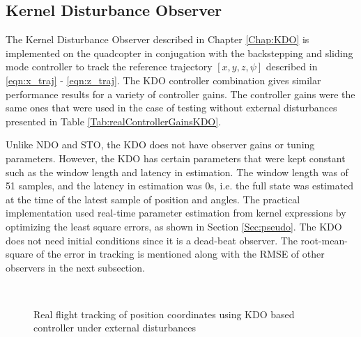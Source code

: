\documentclass[letterpaper%
, twoside%
, 12pt%
,memoire%
, english%
,creativecommons,hyperref%
]{thETS}
\begin{document}
\FloatBarrier
\subsection{Kernel Disturbance Observer}
The Kernel Disturbance Observer described in Chapter \ref{Chap:KDO} is implemented on the quadcopter in conjugation with the backstepping and sliding mode controller to track the reference trajectory $[x,y,z,\psi]$ described in \eqref{eqn:x_traj} - \eqref{eqn:z_traj}. The KDO controller combination gives similar performance results for a variety of controller gains. The controller gains were the same ones that were used in the case of testing without external disturbances presented in Table  \ref{Tab:realControllerGainsKDO}.

Unlike NDO and STO, the KDO does not have observer gains or tuning parameters. However, the KDO has certain parameters that were kept constant such as the window length and latency in estimation. The window length was of 51 samples, and the latency in estimation was 0s, i.e. the full state was estimated at the time of the latest sample of position and angles. The practical implementation used real-time parameter estimation from kernel expressions by optimizing the least square errors, as shown in Section \ref{Sec:pseudo}. The KDO does not need initial conditions since it is a dead-beat observer. The root-mean-square of the error in tracking is mentioned along with the RMSE of other observers in the next subsection.

\begin{figure}[H]
	\centering
	 \\ \parbox{0.75\textwidth}{\caption{Real flight tracking of position coordinates using KDO based controller under external disturbances\label{Fig:xyztracKDODist}}}
\end{figure}
\end{document}
